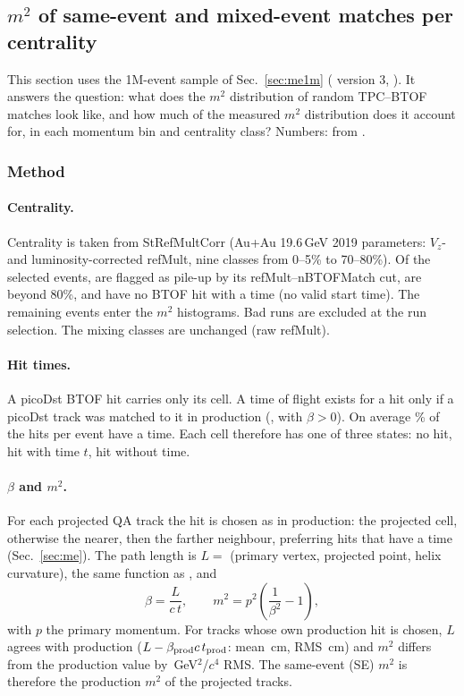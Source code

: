 \subsection{$m^2$ of same-event and mixed-event matches per centrality}
\label{sec:m2}

This section uses the 1M-event sample of Sec.~\ref{sec:me1m} ( version 3,
). It answers the question: what does the $m^2$ distribution of
random TPC--BTOF matches look like, and how much of the measured $m^2$ distribution does it account for, in each
momentum bin and centrality class? Numbers:  from .

\subsubsection{Method}
\paragraph{Centrality.} Centrality is taken from StRefMultCorr (Au+Au 19.6\,GeV 2019 parameters: $V_z$- and
luminosity-corrected refMult, nine classes from 0--5\% to 70--80\%). Of the \mtEvtSelVthree{} selected events,
\mtEvtPileVthree{} are flagged as pile-up by its refMult--nBTOFMatch cut, \mtEvtPeriphVthree{} are beyond 80\%,
and \mtEvtNoTimeVthree{} have no BTOF hit with a time (no valid start time). The remaining \mtEvtUsedVthree{} events
enter the $m^2$ histograms. Bad runs are excluded at the run selection. The mixing classes are unchanged (raw refMult).

\paragraph{Hit times.} A picoDst BTOF hit carries only its cell. A time of flight exists for a hit only if a picoDst
track was matched to it in production (, with $\beta>0$). On average
\mtTimedFracVthree\% of the hits per event have a time. Each cell therefore has one of three states: no hit, hit with
time $t$, hit without time.

\paragraph{$\beta$ and $m^2$.} For each projected QA track the hit is chosen as in production: the projected cell,
otherwise the nearer, then the farther neighbour, preferring hits that have a time (Sec.~\ref{sec:me}). The path length is
$L=$ (primary vertex, projected point, helix curvature), the same function as
, and
\begin{equation}
\beta = \frac{L}{c\,t},\qquad m^2 = p^2\left(\frac{1}{\beta^2}-1\right),
\end{equation}
with $p$ the primary momentum. For tracks whose own production hit is chosen, $L$ agrees with production
($L-\beta_{\rm prod}c\,t_{\rm prod}$: mean \mtDLMeanVthree\,cm, RMS \mtDLRmsVthree\,cm) and $m^2$ differs from the
production value by \mtDmRmsVthree\,GeV$^2$/$c^4$ RMS. The same-event (SE) $m^2$ is therefore the production $m^2$
of the projected tracks.

